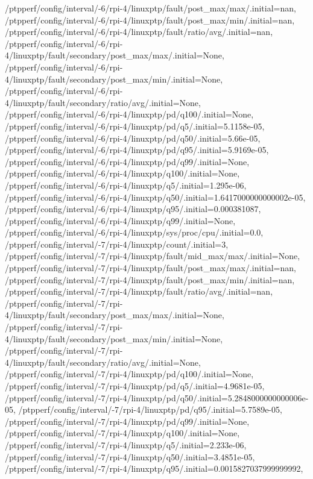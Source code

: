 {    /ptpperf/config/interval/-6/rpi-4/linuxptp/fault/post_max/max/.initial=nan,
    /ptpperf/config/interval/-6/rpi-4/linuxptp/fault/post_max/min/.initial=nan,
    /ptpperf/config/interval/-6/rpi-4/linuxptp/fault/ratio/avg/.initial=nan,
    /ptpperf/config/interval/-6/rpi-4/linuxptp/fault/secondary/post_max/max/.initial=None,
    /ptpperf/config/interval/-6/rpi-4/linuxptp/fault/secondary/post_max/min/.initial=None,
    /ptpperf/config/interval/-6/rpi-4/linuxptp/fault/secondary/ratio/avg/.initial=None,
    /ptpperf/config/interval/-6/rpi-4/linuxptp/pd/q100/.initial=None,
    /ptpperf/config/interval/-6/rpi-4/linuxptp/pd/q5/.initial=5.1158e-05,
    /ptpperf/config/interval/-6/rpi-4/linuxptp/pd/q50/.initial=5.66e-05,
    /ptpperf/config/interval/-6/rpi-4/linuxptp/pd/q95/.initial=5.9169e-05,
    /ptpperf/config/interval/-6/rpi-4/linuxptp/pd/q99/.initial=None,
    /ptpperf/config/interval/-6/rpi-4/linuxptp/q100/.initial=None,
    /ptpperf/config/interval/-6/rpi-4/linuxptp/q5/.initial=1.295e-06,
    /ptpperf/config/interval/-6/rpi-4/linuxptp/q50/.initial=1.6417000000000002e-05,
    /ptpperf/config/interval/-6/rpi-4/linuxptp/q95/.initial=0.000381087,
    /ptpperf/config/interval/-6/rpi-4/linuxptp/q99/.initial=None,
    /ptpperf/config/interval/-6/rpi-4/linuxptp/sys/proc/cpu/.initial=0.0,
    /ptpperf/config/interval/-7/rpi-4/linuxptp/count/.initial=3,
    /ptpperf/config/interval/-7/rpi-4/linuxptp/fault/mid_max/max/.initial=None,
    /ptpperf/config/interval/-7/rpi-4/linuxptp/fault/post_max/max/.initial=nan,
    /ptpperf/config/interval/-7/rpi-4/linuxptp/fault/post_max/min/.initial=nan,
    /ptpperf/config/interval/-7/rpi-4/linuxptp/fault/ratio/avg/.initial=nan,
    /ptpperf/config/interval/-7/rpi-4/linuxptp/fault/secondary/post_max/max/.initial=None,
    /ptpperf/config/interval/-7/rpi-4/linuxptp/fault/secondary/post_max/min/.initial=None,
    /ptpperf/config/interval/-7/rpi-4/linuxptp/fault/secondary/ratio/avg/.initial=None,
    /ptpperf/config/interval/-7/rpi-4/linuxptp/pd/q100/.initial=None,
    /ptpperf/config/interval/-7/rpi-4/linuxptp/pd/q5/.initial=4.9681e-05,
    /ptpperf/config/interval/-7/rpi-4/linuxptp/pd/q50/.initial=5.2848000000000006e-05,
    /ptpperf/config/interval/-7/rpi-4/linuxptp/pd/q95/.initial=5.7589e-05,
    /ptpperf/config/interval/-7/rpi-4/linuxptp/pd/q99/.initial=None,
    /ptpperf/config/interval/-7/rpi-4/linuxptp/q100/.initial=None,
    /ptpperf/config/interval/-7/rpi-4/linuxptp/q5/.initial=2.233e-06,
    /ptpperf/config/interval/-7/rpi-4/linuxptp/q50/.initial=3.4851e-05,
    /ptpperf/config/interval/-7/rpi-4/linuxptp/q95/.initial=0.0015827037999999992,
}
